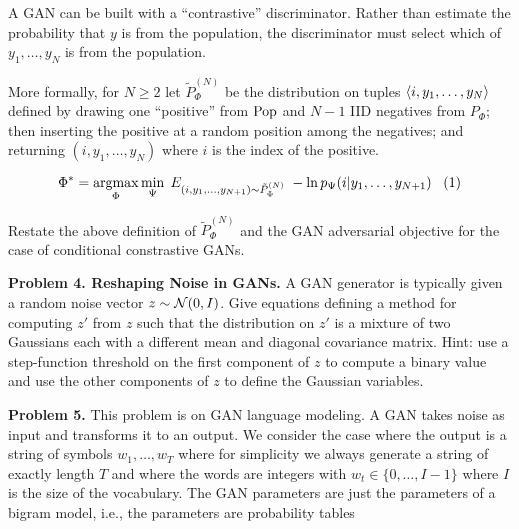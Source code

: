 \documentclass{article}
\newcommand{\solution}[1]{}
\begin{document}
A GAN can be built with a ``contrastive'' discriminator.  Rather than
estimate the probability that $y$ is from the population, the
discriminator must select which of $y_1,\ldots,y_N$ is from the
population.

\medskip
More formally, for $N \geq 2$ let $\tilde{P}_\Phi^{(N)}$ be the distribution on tuples ${\mbox{$\langle i,y_1,\ldots,y_N\rangle$}}$ defined by drawing one
``positive'' from $\mathrm{Pop}$ and $N-1$ IID negatives from $P_\Phi$; then
inserting the positive at a random position among the negatives; and
returning $(i,y_1,\ldots,y_N)$ where $i$ is the index of the positive.

$$\Phi^* = \operatorname*{argmax}_\Phi \min_\Psi \;E_{(i,y_1,\ldots,y_{N+1}) \sim \tilde{P}_\Phi^{(N)}}\; - \ln p_\Psi(i|y_1,\ldots,y_{N+1}) \;\;\;(1)$$

\medskip
Restate the above definition of $\tilde{P}_\Phi^{(N)}$ and the GAN adversarial objective for the case of conditional constrastive GANs.

\solution{
  $$\Phi^* = \argmax_\Phi \min_\Psi \;E_{(i,y_1,\ldots,y_{N+1},x) \sim \tilde{P}^{(N)}_\Phi} \ln - P_\Psi(i|y_1,\ldots,y_{N+1},x)$$
}

\bigskip 

{\bf Problem 4. Reshaping Noise in GANs.} A GAN generator is typically given a random noise vector $z \sim {\cal N}(0,I)$.  Give equations defining a method for computing $z'$ from $z$ such that
the distribution on $z'$ is a
mixture of two Gaussians each with a different mean and diagonal covariance matrix.  Hint: use a step-function threshold on the first component of $z$ to compute a binary value and use the other components
of $z$ to define the Gaussian variables.

\solution{
  \begin{eqnarray*}
    y & = & \mathbf{1}[z[0] \geq 0] \\
    \\
    z' & = & y(\mu_1 + \sigma_1 \odot z[1:d]) + (1-y)(\mu_2 + \sigma_2 \odot z[1:d])
  \end{eqnarray*}
}
    

\bigskip
{\bf Problem 5.}  This problem is on GAN language modeling.  A GAN takes noise as input and transforms it to an output.  We consider the case where the output is a string of symbols $w_1,\ldots, w_T$
where for simplicity we always generate a string of exactly length $T$ and where the words are integers with $w_t \in \{0,\ldots,I-1\}$ where $I$ is the size of the vocabulary.
The GAN parameters are just the parameters of a bigram model, i.e., the parameters are probability tables
\end{document}
